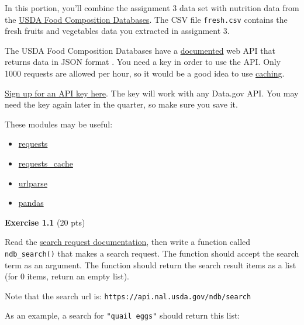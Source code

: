 \documentclass[11pt]{article}
\providecommand{\tightlist}{%
      \setlength{\itemsep}{0pt}\setlength{\parskip}{0pt}}
\begin{document}
In this portion, you'll combine the assignment 3 data set with nutrition
data from the \href{https://ndb.nal.usda.gov/ndb/search/list}{USDA Food
Composition Databases}. The CSV file \texttt{fresh.csv} contains the
fresh fruits and vegetables data you extracted in assignment 3.

The USDA Food Composition Databases have a
\href{https://ndb.nal.usda.gov/ndb/doc/index}{documented} web API that
returns data in JSON format . You need a key in order to use the API.
Only 1000 requests are allowed per hour, so it would be a good idea to
use \href{https://pypi.python.org/pypi/requests-cache}{caching}.

\href{https://api.data.gov/signup/}{Sign up for an API key here}. The
key will work with any Data.gov API. You may need the key again later in
the quarter, so make sure you save it.

These modules may be useful:

\begin{itemize}
\tightlist
\item
  \href{http://docs.python-requests.org/en/master/user/quickstart/}{requests}
\item
  \href{https://pypi.python.org/pypi/requests-cache}{requests\_cache}
\item
  \href{https://docs.python.org/2/library/urlparse.html}{urlparse}
\item
  \href{http://pandas.pydata.org/pandas-docs/stable/}{pandas}
\end{itemize}

    \textbf{Exercise 1.1} (20 pts)

Read the
\href{https://ndb.nal.usda.gov/ndb/doc/apilist/API-SEARCH.md}{search
request documentation}, then write a function called
\texttt{ndb\_search()} that makes a search request. The function should
accept the search term as an argument. The function should return the
search result items as a list (for 0 items, return an empty list).

Note that the search url is:
\texttt{https://api.nal.usda.gov/ndb/search}

As an example, a search for \texttt{"quail\ eggs"} should return this
list:
\end{document}
